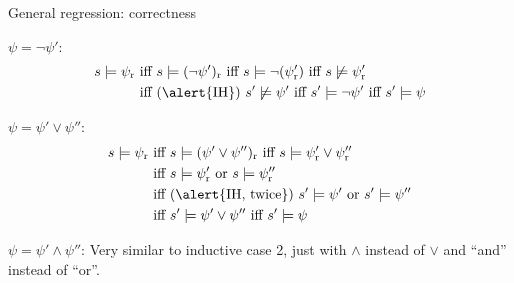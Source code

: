 \documentclass{gkibeamer}
\begin{document}
\begin{frame}{General regression: correctness}
  \begin{proofend}
    \begin{description}
    \item[Inductive case 1] $\psi = \neg \psi'$:
      \vspace{-3mm}
      \begin{align*}
        s \models \psi_{\text{r}}
        & \text{ iff } s \models (\neg \psi')_{\text{r}}
        \text{ iff } s \models \neg(\psi'_{\text{r}})
        \text{ iff } s \not\models \psi'_{\text{r}}\\
        & \text{ iff (\alert{IH}) } s' \not\models \psi'
        \text{ iff } s' \models \neg\psi'
        \text{ iff } s' \models \psi
      \end{align*}
      \vspace{-8mm}
      \pause
    \item[Inductive case 2] $\psi = \psi' \lor \psi''$:
      \vspace{-3mm}
      \begin{align*}
        s \models \psi_{\text{r}}
        & \text{ iff } s \models (\psi' \lor \psi'')_{\text{r}}
        \text{ iff } s \models \psi'_{\text{r}} \lor \psi''_{\text{r}}\\
        & \text{ iff } s \models \psi'_{\text{r}} \text{ or } s \models \psi''_{\text{r}}\\
        & \text{ iff (\alert{IH, twice}) } s' \models \psi' \text{ or } s' \models \psi''\\
        & \text{ iff } s' \models \psi' \lor \psi''
        \text{ iff } s' \models \psi
      \end{align*}
      \vspace{-8mm}
      \pause
    \item[Inductive case 3] $\psi = \psi' \land \psi''$: Very similar
      to inductive case 2, just with $\land$ instead of $\lor$ and
      ``and'' instead of ``or''.
    \end{description}
  \end{proofend}
\end{frame}
\end{document}
